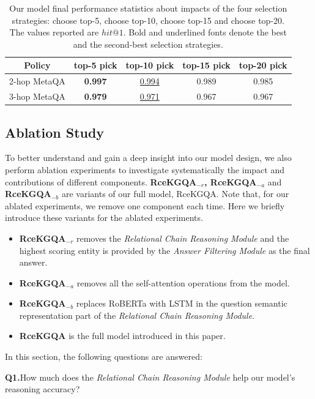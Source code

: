\documentclass[pdflatex,sn-mathphys]{sn-jnl}%
\theoremstyle{thmstyleone}%
\theoremstyle{thmstyletwo}%
\theoremstyle{thmstylethree}%
\begin{document}
\begin{table}[h]
    \centering
    \begin{tabular}{c|c|c|c|c} \hline
        Policy & top-5 pick & top-10 pick & top-15 pick & top-20 pick \\ \hline
        2-hop MetaQA  & \textbf{0.997} & \underline{0.994} & 0.989 & 0.985 \\
        3-hop MetaQA  & \textbf{0.979} & \underline{0.971} & 0.967 & 0.967 \\ \hline
    \end{tabular}
    \caption{Our model final performance statistics about impacts of the four selection strategies: choose top-5, choose top-10, choose top-15 and choose top-20. The values reported are $hit@1$. Bold and underlined fonts denote the best and the second-best selection strategies.}
    \label{topselectionpolicy}
\end{table}

\subsection{Ablation Study}
To better understand and gain a deep insight into our model design, we also perform ablation experiments to investigate systematically the impact and contributions of different components.  \textbf{RceKGQA$_{-r}$, RceKGQA$_{-a}$} and \textbf{ RceKGQA$_{-b}$} are variants of our full model, RceKGQA. Note that, for our ablated experiments, we remove one component each time. Here we briefly introduce these variants for the ablated experiments.
\begin{itemize}
\item \textbf{RceKGQA$_{-r}$} removes the \textit{Relational Chain Reasoning Module} and the highest scoring entity is provided by the \textit{Answer Filtering Module} as the final answer. 
\item \textbf{RceKGQA$_{-a}$} removes all the self-attention operations from the model. 
\item \textbf{RceKGQA$_{-b}$} replaces RoBERTa with LSTM in the question semantic representation part of the \textit{Relational Chain Reasoning Module}.
\item \textbf{RceKGQA} is the full model introduced in this paper.
\end{itemize}


In this section, the following questions are answered:

\textbf{Q1.}\quad How much does the \textit{Relational Chain Reasoning Module} help our model's reasoning accuracy?
\end{document}
